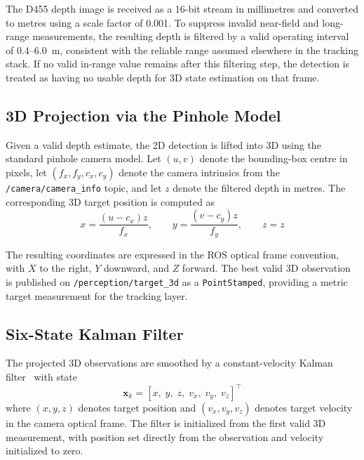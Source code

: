 \documentclass[11pt,letterpaper]{article}
\begin{document}
The D455 depth image is received as a 16-bit stream in millimetres and converted to metres using a scale factor of 0.001. To suppress invalid near-field and long-range measurements, the resulting depth is filtered by a valid operating interval of 0.4--6.0~m, consistent with the reliable range assumed elsewhere in the tracking stack. If no valid in-range value remains after this filtering step, the detection is treated as having no usable depth for 3D state estimation on that frame.

\subsection{3D Projection via the Pinhole Model}
\label{sec:depth_projection}

Given a valid depth estimate, the 2D detection is lifted into 3D using the standard pinhole camera model. Let $(u,v)$ denote the bounding-box centre in pixels, let $(f_x,f_y,c_x,c_y)$ denote the camera intrinsics from the \texttt{/camera/camera\_info} topic, and let $z$ denote the filtered depth in metres. The corresponding 3D target position is computed as
\begin{equation}
x = \frac{(u-c_x)z}{f_x}, \qquad
y = \frac{(v-c_y)z}{f_y}, \qquad
z = z
\label{eq:pinhole_projection}
\end{equation}

The resulting coordinates are expressed in the ROS optical frame convention, with $X$ to the right, $Y$ downward, and $Z$ forward. The best valid 3D observation is published on \texttt{/perception/target\_3d} as a \texttt{PointStamped}, providing a metric target measurement for the tracking layer.

\subsection{Six-State Kalman Filter}
\label{sec:kalman_formulation}

The projected 3D observations are smoothed by a constant-velocity Kalman filter~\cite{kalmanfilter1960} with state
\begin{equation}
\mathbf{x}_k = [x,\;y,\;z,\;v_x,\;v_y,\;v_z]^\top
\label{eq:kalman_state}
\end{equation}
where $(x,y,z)$ denotes target position and $(v_x,v_y,v_z)$ denotes target velocity in the camera optical frame. The filter is initialized from the first valid 3D measurement, with position set directly from the observation and velocity initialized to zero.
\end{document}
